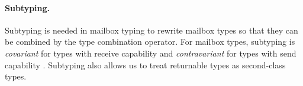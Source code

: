 \paragraph{Subtyping.}
Subtyping is needed in mailbox typing to rewrite mailbox types so that they can
be combined by the type combination operator.
For mailbox types, subtyping is \emph{covariant} for types with receive
capability and \emph{contravariant} for types with send capability
\cite{deliguoroMailboxTypesUnordered2018}.
Subtyping also allows us to treat returnable types as second-class types.



